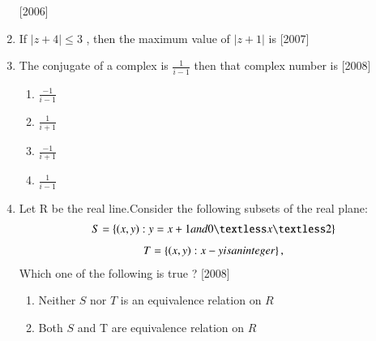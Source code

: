 \documentclass[journal,12pt,twocolumn,article]{IEEEtran}
\theoremstyle{remark}
\begin{document}
\begin{enumerate}[start = 14]
\hfill{[2006]}
\begin{enumerate}
\end{enumerate}
\item If $|z+4|\leq 3$ , then the maximum value of $|z+1|$ is
\hfill{[2007]}                                     
\begin{enumerate}                                  
\end{enumerate}
\item The conjugate of a complex is $\frac{1}{i-1}$ then that complex number is
\hfill{[2008]}
\begin{multicols}{4}
\begin{enumerate}
\item $\frac{-1}{i-1}$
\item $\frac{1}{i+1}$
\item $\frac{-1}{i+1}$
\item $\frac{1}{i-1}$
\end{enumerate}
\end{multicols}
\item Let R be the real line.Consider the following subsets of the real plane: 
\begin{align}
S=\cbrak{(x,y):y=x+1 and 0{\textless}x{\textless}2}
\end{align}
\begin{align}
T=\left\{(x,y):x-y is an integer\right\}, 
\end{align}
Which one of the following is true ?
\hfill{[2008]}
\begin{enumerate}
\item \text Neither $S$ nor $T$ is an equivalence relation on $R$                                        
                                
\item \text Both $S$ and T are equivalence relation on $R$ 
                                

\end{enumerate}
\end{enumerate}
\end{document}
